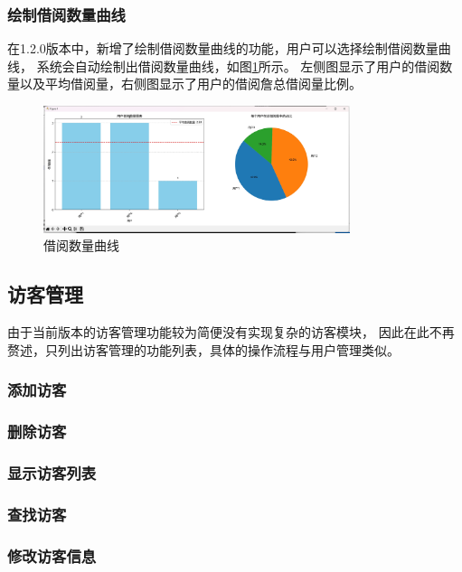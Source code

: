 \documentclass[12pt,twoside]{ctexart}
\begin{document}
\subsubsection{绘制借阅数量曲线}

在1.2.0版本中，新增了绘制借阅数量曲线的功能，用户可以选择绘制借阅数量曲线，
系统会自动绘制出借阅数量曲线，如图\ref{fig:UserCurve}所示。
左侧图显示了用户的借阅数量以及平均借阅量，右侧图显示了用户的借阅詹总借阅量比例。

\begin{figure}[H]
    \centering
    \includegraphics[width=0.8\textwidth]{UserCurve.png}
    \caption{借阅数量曲线}
    \label{fig:UserCurve}
\end{figure}

\newpage
\subsection{访客管理}

由于当前版本的访客管理功能较为简便没有实现复杂的访客模块，
因此在此不再赘述，只列出访客管理的功能列表，具体的操作流程与用户管理类似。

\subsubsection{添加访客}

\subsubsection{删除访客}

\subsubsection{显示访客列表}

\subsubsection{查找访客}

\subsubsection{修改访客信息}
\end{document}
